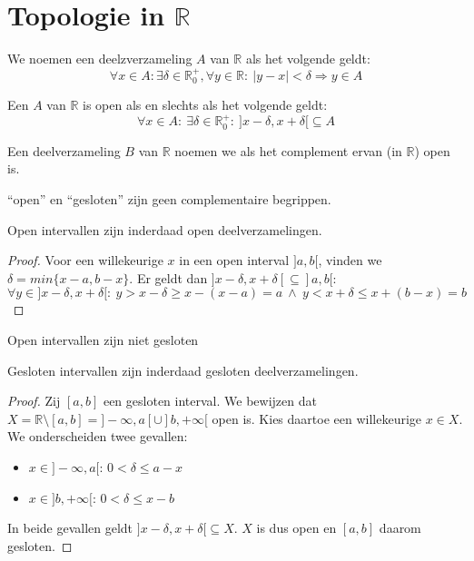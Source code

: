 \documentclass[main.tex]{subfiles}
\begin{document}
\section{Topologie in $\mathbb{R}$}
\label{sec:topologie-mathbbr}

\begin{de}
  We noemen een deelzverzameling $A$ van $\mathbb{R}$  als het volgende geldt:
  \[ \forall x\in A: \exists \delta \in \mathbb{R}_{0}^{+}, \forall y\in \mathbb{R}:\ |y-x| < \delta \Rightarrow y\in A \]
\end{de}

\begin{st}
  Een $A$ van $\mathbb{R}$ is open als en slechts als het volgende geldt:
  \[ \forall x\in A:\ \exists \delta \in \mathbb{R}_{0}^{+}:\ ]x-\delta,x+\delta[ \subseteq A \]

\end{st}

\begin{de}
  Een deelverzameling $B$ van $\mathbb{R}$ noemen we  als het complement ervan (in $\mathbb{R}$) open is.
\end{de}

\begin{opm}
  ``open'' en ``gesloten'' zijn geen complementaire begrippen.
\end{opm}

\begin{st}
  Open intervallen zijn inderdaad open deelverzamelingen.

  \begin{proof}
    Voor een willekeurige $x$ in een open interval $]a,b[$, vinden we $\delta = min\{x-a,b-x\}$.
    Er geldt dan $]x-\delta,x+\delta[ \subseteq ]a,b[$:
    \[ \forall y\in ]x-\delta,x+\delta[:\ y > x-\delta \ge x-(x-a) = a \ \wedge\ y < x+\delta \le x+(b-x) = b \]
  \end{proof}
\end{st}

\begin{st}
  Open intervallen zijn niet gesloten
\end{st}

\begin{st}
  Gesloten intervallen zijn inderdaad gesloten deelverzamelingen.

  \begin{proof}
    Zij $[a,b]$ een gesloten interval.
    We bewijzen dat $X = \mathbb{R} \setminus [a,b] = ]-\infty,a[ \cup]b,+\infty[$ open is.
    Kies daartoe een willekeurige $x\in X$.
    We onderscheiden twee gevallen:
    \begin{itemize}
    \item $x \in ]-\infty,a[$: $0 < \delta \le a-x$
    \item $x \in  ]b,+\infty[$: $0 < \delta \le x-b$
    \end{itemize}
    In beide gevallen geldt $]x-\delta, x+\delta[ \subseteq X$. $X$ is dus open en $[a,b]$ daarom gesloten.
  \end{proof}
\end{st}
\end{document}

